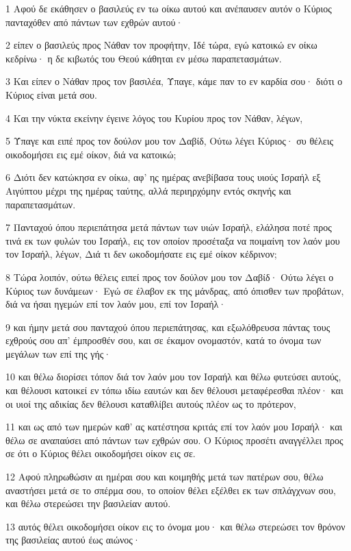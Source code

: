 \par 1 Αφού δε εκάθησεν ο βασιλεύς εν τω οίκω αυτού και ανέπαυσεν αυτόν ο Κύριος πανταχόθεν από πάντων των εχθρών αυτού·
\par 2 είπεν ο βασιλεύς προς Νάθαν τον προφήτην, Ιδέ τώρα, εγώ κατοικώ εν οίκω κεδρίνω· η δε κιβωτός του Θεού κάθηται εν μέσω παραπετασμάτων.
\par 3 Και είπεν ο Νάθαν προς τον βασιλέα, Ύπαγε, κάμε παν το εν καρδία σου· διότι ο Κύριος είναι μετά σου.
\par 4 Και την νύκτα εκείνην έγεινε λόγος του Κυρίου προς τον Νάθαν, λέγων,
\par 5 Ύπαγε και ειπέ προς τον δούλον μου τον Δαβίδ, Ούτω λέγει Κύριος· συ θέλεις οικοδομήσει εις εμέ οίκον, διά να κατοικώ;
\par 6 Διότι δεν κατώκησα εν οίκω, αφ' ης ημέρας ανεβίβασα τους υιούς Ισραήλ εξ Αιγύπτου μέχρι της ημέρας ταύτης, αλλά περιηρχόμην εντός σκηνής και παραπετασμάτων.
\par 7 Πανταχού όπου περιεπάτησα μετά πάντων των υιών Ισραήλ, ελάλησα ποτέ προς τινά εκ των φυλών του Ισραήλ, εις τον οποίον προσέταξα να ποιμαίνη τον λαόν μου τον Ισραήλ, λέγων, Διά τι δεν ωκοδομήσατε εις εμέ οίκον κέδρινον;
\par 8 Τώρα λοιπόν, ούτω θέλεις ειπεί προς τον δούλον μου τον Δαβίδ· Ούτω λέγει ο Κύριος των δυνάμεων· Εγώ σε έλαβον εκ της μάνδρας, από όπισθεν των προβάτων, διά να ήσαι ηγεμών επί τον λαόν μου, επί τον Ισραήλ·
\par 9 και ήμην μετά σου πανταχού όπου περιεπάτησας, και εξωλόθρευσα πάντας τους εχθρούς σου απ' έμπροσθέν σου, και σε έκαμον ονομαστόν, κατά το όνομα των μεγάλων των επί της γής·
\par 10 και θέλω διορίσει τόπον διά τον λαόν μου τον Ισραήλ και θέλω φυτεύσει αυτούς, και θέλουσι κατοικεί εν τόπω ιδίω εαυτών και δεν θέλουσι μεταφέρεσθαι πλέον· και οι υιοί της αδικίας δεν θέλουσι καταθλίβει αυτούς πλέον ως το πρότερον,
\par 11 και ως από των ημερών καθ' ας κατέστησα κριτάς επί τον λαόν μου Ισραήλ· και θέλω σε αναπαύσει από πάντων των εχθρών σου. Ο Κύριος προσέτι αναγγέλλει προς σε ότι ο Κύριος θέλει οικοδομήσει οίκον εις σε.
\par 12 Αφού πληρωθώσιν αι ημέραι σου και κοιμηθής μετά των πατέρων σου, θέλω αναστήσει μετά σε το σπέρμα σου, το οποίον θέλει εξέλθει εκ των σπλάγχνων σου, και θέλω στερεώσει την βασιλείαν αυτού.
\par 13 αυτός θέλει οικοδομήσει οίκον εις το όνομα μου· και θέλω στερεώσει τον θρόνον της βασιλείας αυτού έως αιώνος·
